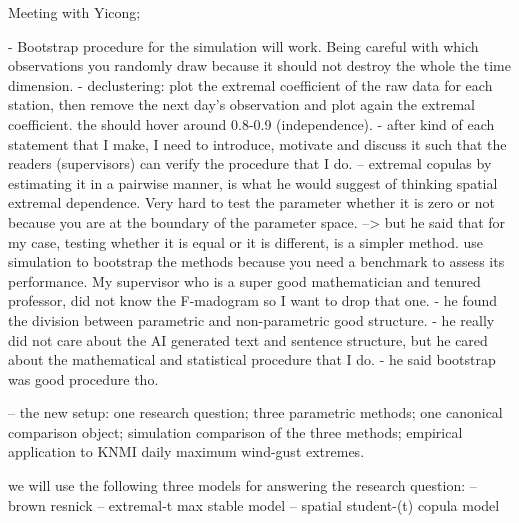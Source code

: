 Meeting with Yicong;

- Bootstrap procedure for the simulation will work. Being careful with which observations you randomly draw because it should not destroy the whole the time dimension.
- declustering: plot the extremal coefficient of the raw data for each station, then remove the next day's observation and plot again the extremal coefficient. the should hover around 0.8-0.9 (independence).
- after kind of each statement that I make, I need to introduce, motivate and discuss it such that the readers (supervisors) can verify the procedure that I do.
-- extremal copulas by estimating it in a pairwise manner, is what he would suggest of thinking spatial extremal dependence.
Very hard to test the parameter whether it is zero or not because you are at the boundary of the parameter space.
--> but he said that for my case, testing whether it is equal or it is different, is a simpler method.
use simulation to bootstrap the methods because you need a benchmark to assess its performance.
My supervisor who is a super good mathematician and tenured professor, did not know the F-madogram so I want to drop that one.
- he found the division between parametric and non-parametric good structure.
- he really did not care about the AI generated text and sentence structure, but he cared about the mathematical and statistical procedure that I do.
- he said bootstrap was good procedure tho.


-- the new setup:
one research question;
three parametric methods;
one canonical comparison object;
simulation comparison of the three methods;
empirical application to KNMI daily maximum wind-gust extremes.

we will use the following three models for answering the research question:
-- brown resnick
-- extremal-t max stable model
-- spatial student-(t) copula model